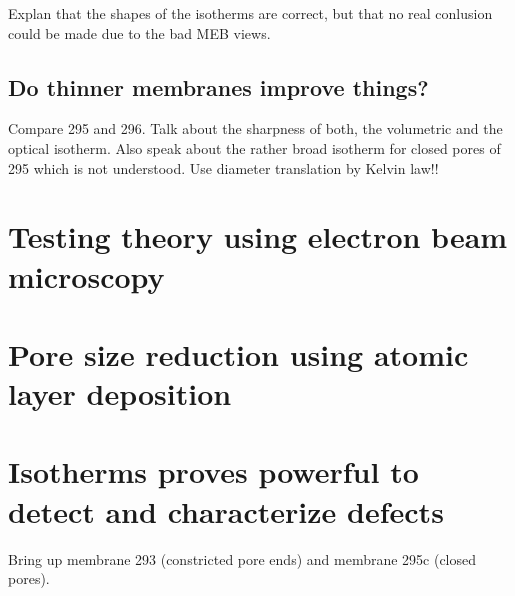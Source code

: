 \documentclass[../thesis.tex]{subfiles}
\begin{document}
                  Explan that the shapes of the isotherms are correct, but that no real conlusion could be made due to the bad MEB views.



        \subsection{Do thinner membranes improve things?}
        \label{sec:thinner-membranes}

          Compare 295 and 296. Talk about the sharpness of both, the volumetric and the optical isotherm. Also speak about the rather broad isotherm for closed pores of 295 which is not understood. Use diameter translation by Kelvin law!!


      \section{Testing theory using electron beam microscopy}
      \label{sec:testing-theory}


      \section{Pore size reduction using atomic layer deposition}


      \section{Isotherms proves powerful to detect and characterize defects}
      \label{sec:theory-and-defects}

      Bring up membrane 293 (constricted pore ends) and membrane 295c (closed pores).
\end{document}
